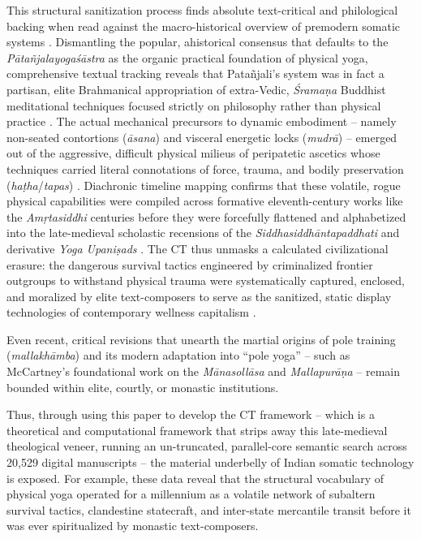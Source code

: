 \documentclass[11pt,twoside,letterpaper]{article}
\begin{document}
This structural sanitization process finds absolute text-critical and philological backing when read against the macro-historical overview of premodern somatic systems \citep{Mallinson2017}. Dismantling the popular, ahistorical consensus that defaults to the \textit{Pātañjalayogaśāstra} as the organic practical foundation of physical yoga, comprehensive textual tracking reveals that Patañjali’s system was in fact a partisan, elite Brahmanical appropriation of extra-Vedic, \textit{Śramaṇa} Buddhist meditational techniques focused strictly on philosophy rather than physical practice \citep{Mallinson2017}. The actual mechanical precursors to dynamic embodiment – namely non-seated contortions (\textit{āsana}) and visceral energetic locks (\textit{mudrā}) – emerged out of the aggressive, difficult physical milieus of peripatetic ascetics whose techniques carried literal connotations of force, trauma, and bodily preservation (\textit{haṭha}/\textit{tapas}) \citep{Mallinson2017}. Diachronic timeline mapping confirms that these volatile, rogue physical capabilities were compiled across formative eleventh-century works like the \textit{Amṛtasiddhi} centuries before they were forcefully flattened and alphabetized into the late-medieval scholastic recensions of the \textit{Siddhasiddhāntapaddhati} and derivative \textit{Yoga Upaniṣads} \citep{Birch2024, Mallinson2017}. The CT thus unmasks a calculated civilizational erasure: the dangerous survival tactics engineered by criminalized frontier outgroups to withstand physical trauma were systematically captured, enclosed, and moralized by elite text-composers to serve as the sanitized, static display technologies of contemporary wellness capitalism \citep{Debnath2024, Mallinson2017, McCartney2021}.

Even recent, critical revisions that unearth the martial origins of pole training (\textit{mallakhāmba}) and its modern adaptation into “pole yoga” – such as McCartney’s foundational work on the \textit{Mānasollāsa} and \textit{Mallapurāṇa} – remain bounded within elite, courtly, or monastic institutions. 

Thus, through using this paper to develop the CT framework -- which is a theoretical and computational framework that strips away this late-medieval theological veneer, running an un-truncated, parallel-core semantic search across 20,529 digital manuscripts -- the material underbelly of Indian somatic technology is exposed. For example, these data reveal that the structural vocabulary of physical yoga operated for a millennium as a volatile network of subaltern survival tactics, clandestine statecraft, and inter-state mercantile transit before it was ever spiritualized by monastic text-composers.
\end{document}
